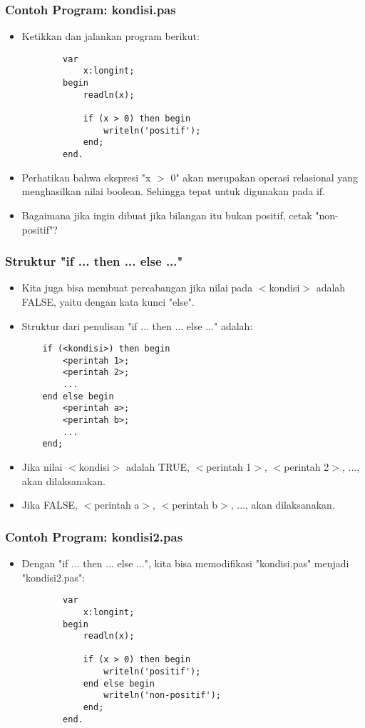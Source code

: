 \documentclass{beamer}
\begin{document}
\begin{frame}[fragile]
\frametitle{Contoh Program: kondisi.pas}
\begin{itemize}
	\item Ketikkan dan jalankan program berikut:
	\begin{lstlisting}
		var
		    x:longint;
		begin
		    readln(x);
		
		    if (x > 0) then begin
		        writeln('positif');
		    end;
		end.
	\end{lstlisting}
	\item Perhatikan bahwa ekspresi "x $>$ 0" akan merupakan operasi relasional yang menghasilkan nilai boolean. Sehingga tepat untuk digunakan pada if.
	\item Bagaimana jika ingin dibuat jika bilangan itu bukan positif, cetak "non-positif"?
\end{itemize}
\end{frame}

\begin{frame}[fragile]
\frametitle{Struktur "if ... then ... else ..."}
\begin{itemize}
	\item Kita juga bisa membuat percabangan jika nilai pada $<$kondisi$>$ adalah FALSE, yaitu dengan kata kunci "else".
	\item Struktur dari penulisan "if ... then ... else ..." adalah:
	\begin{lstlisting}
	if (<kondisi>) then begin
	    <perintah 1>;
	    <perintah 2>;
	    ...
	end else begin
	    <perintah a>;
	    <perintah b>;
	    ...	
	end;
	\end{lstlisting}
	
	\item Jika nilai $<$kondisi$>$ adalah TRUE, $<$perintah 1$>$, $<$perintah 2$>$, ..., akan dilaksanakan.
	\item Jika FALSE, $<$perintah a$>$, $<$perintah b$>$, ..., akan dilaksanakan.
\end{itemize}
\end{frame}

\begin{frame}[fragile]
\frametitle{Contoh Program: kondisi2.pas}
\begin{itemize}
	\item Dengan "if ... then ... else ...", kita bisa memodifikasi "kondisi.pas" menjadi "kondisi2.pas":
	\begin{lstlisting}
		var
		    x:longint;
		begin
		    readln(x);
		
		    if (x > 0) then begin
		        writeln('positif');
		    end else begin
		        writeln('non-positif');
		    end;
		end.
	\end{lstlisting}
\end{itemize}
\end{frame}
\end{document}
